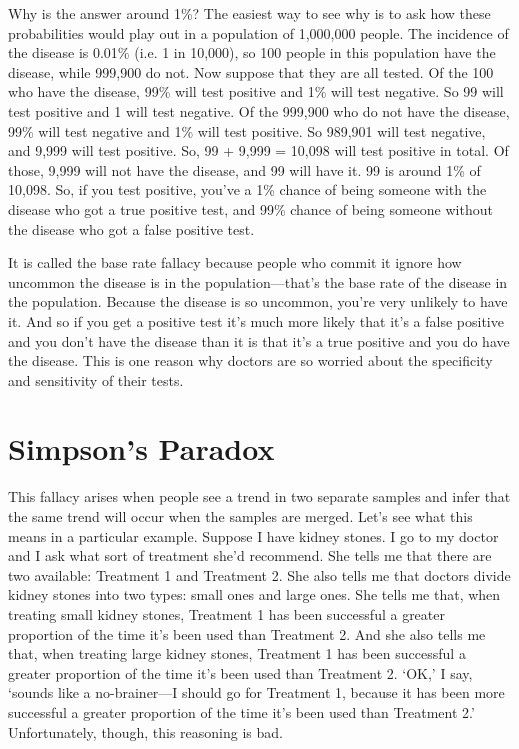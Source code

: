 Why is the answer around 1\%? The easiest way to see why is to ask how these probabilities would play out in a population of 1,000,000 people. The incidence of the disease is 0.01\% (i.e. 1 in 10,000), so 100 people in this population have the disease, while 999,900 do not. Now suppose that they are all tested. Of the 100 who have the disease, 99\% will test positive and 1\% will test negative. So 99 will test positive and 1 will test negative. Of the 999,900 who do not have the disease, 99\% will test negative and 1\% will test positive. So 989,901 will test negative, and 9,999 will test positive. So, 99 + 9,999 = 10,098 will test positive in total. Of those, 9,999 will not have the disease, and 99 will have it. 99 is around 1\% of 10,098. So, if you test positive, you've a 1\% chance of being someone with the disease who got a true positive test, and 99\% chance of being someone without the disease who got a false positive test.

It is called the base rate fallacy because people who commit it ignore how uncommon the disease is in the population---that's the base rate of the disease in the population. Because the disease is so uncommon, you're very unlikely to have it. And so if you get a positive test it's much more likely that it's a false positive and you don't have the disease than it is that it's a true positive and you do have the disease. This is one reason why doctors are so worried about the specificity and sensitivity of their tests.

\section{Simpson's Paradox}

This fallacy arises when people see a trend in two separate samples and infer that the same trend will occur when the samples are merged. Let's see what this means in a particular example. Suppose I have kidney stones. I go to my doctor and I ask what sort of treatment she'd recommend. She tells me that there are two available: Treatment 1 and Treatment 2. She also tells me that doctors divide kidney stones into two types: small ones and large ones. She tells me that, when treating small kidney stones, Treatment 1 has been successful a greater proportion of the time it's been used than Treatment 2. And she also tells me that, when treating large kidney stones, Treatment 1 has been successful a greater proportion of the time it's been used than Treatment 2. `OK,' I say, `sounds like a no-brainer---I should go for Treatment 1, because it has been more successful a greater proportion of the time it's been used than Treatment 2.' Unfortunately, though, this reasoning is bad.

